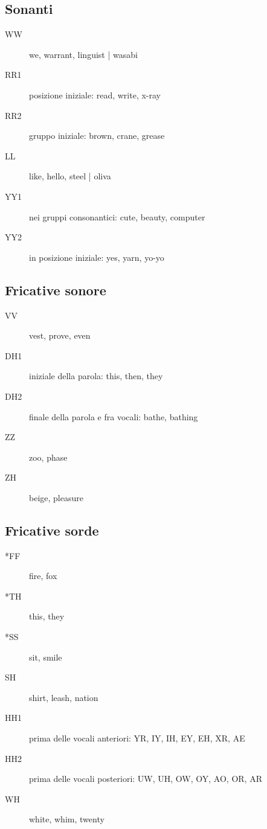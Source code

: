 \subsection{Sonanti}
\begin{description}
\item[WW] we, warrant, linguist | wasabi
\item[RR1] posizione iniziale: read, write, x-ray
\item[RR2] gruppo iniziale: brown, crane, grease
\item[LL] like, hello, steel | oliva
\item[YY1] nei gruppi consonantici: cute, beauty, computer
\item[YY2] in posizione iniziale: yes, yarn, yo-yo
\end{description}

\subsection{Fricative sonore}
\begin{description}
\item[VV] vest, prove, even
\item[DH1] iniziale della parola: this, then, they
\item[DH2] finale della parola e fra vocali: bathe, bathing
\item[ZZ] zoo, phase
\item[ZH] beige, pleasure
\end{description}

\subsection{Fricative sorde}
\begin{description}
\item[*FF] fire, fox
\item[*TH] this, they
\item[*SS] sit, smile
\item[SH] shirt, leash, nation
\item[HH1] prima delle vocali anteriori: YR, IY, IH, EY, EH, XR, AE
\item[HH2] prima delle vocali posteriori: UW, UH, OW, OY, AO, OR, AR
\item[WH] white, whim, twenty
\end{description}

